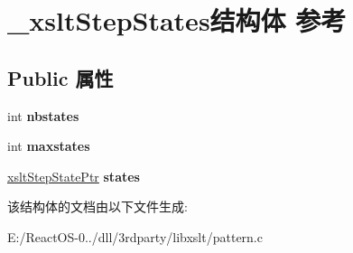 \hypertarget{struct__xslt_step_states}{}\section{\+\_\+xslt\+Step\+States结构体 参考}
\label{struct__xslt_step_states}
\subsection*{Public 属性}
\begin{DoxyCompactItemize}
\item 
\mbox{\label{struct__xslt_step_states_af30751c9baec6c923f1f7b97446fb2f1}} 
int {\bfseries nbstates}
\item 
\mbox{\label{struct__xslt_step_states_a9f76434bb1907c08059752a7bae6515a}} 
int {\bfseries maxstates}
\item 
\mbox{\label{struct__xslt_step_states_a5d92ffdf7e2d7ca1d625b128a8980d18}} 
\hyperlink{struct__xslt_step_state}{xslt\+Step\+State\+Ptr} {\bfseries states}
\end{DoxyCompactItemize}


该结构体的文档由以下文件生成\+:\begin{DoxyCompactItemize}
\item 
E\+:/\+React\+O\+S-\/0../dll/3rdparty/libxslt/pattern.\+c\end{DoxyCompactItemize}
